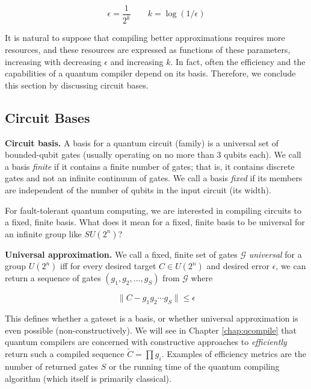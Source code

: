 \begin{equation}
\epsilon = \frac{1}{2^k} \qquad
k = \log(1/\epsilon)
\end{equation}

It is natural to suppose that compiling better approximations requires
more resources, and these resources are expressed as functions of
these
parameters, increasing with decreasing $\epsilon$ and increasing $k$.
In fact, often the efficiency and the
capabilities of a quantum
compiler depend on its basis. Therefore, we conclude this section by
discussing circuit bases.

\subsection{Circuit Bases}
\label{subsec:qcompile-bases}

\begin{definition}{\textbf{Circuit basis.}}
A basis for a quantum circuit (family) is a universal set of
bounded-qubit gates (usually operating on no more than 3 qubits each).
We call a basis \emph{finite} if it contains a finite
number of gates; that is, it contains discrete gates and not an infinite
continuum of gates. We call a basis \emph{fixed} if its members are independent
of the number of qubits in the input circuit (its width).
\end{definition}

For fault-tolerant quantum computing, we are interested in compiling
circuits to a fixed, finite basis. What does it mean for a fixed, finite
basis to be universal for an infinite group like $SU(2^n)$?

\begin{definition}{\textbf{Universal approximation.}}
We call a fixed, finite set of gates $\mathcal{G}$ \emph{universal} for
a group $U(2^n)$ iff for every desired target $C \in U(2^n)$ and
desired error $\epsilon$, we can return a
sequence of gates $(g_1,g_2,\ldots,g_S)$ from $\mathcal{G}$ where

\begin{equation}
\| C - g_1 g_2 \cdots g_S \| \le \epsilon
\end{equation}

\end{definition}

This defines whether a gateset is a basis, or whether universal approximation
is even possible (non-constructively). We will see in
Chapter \ref{chap:qcompile} that
quantum compilers are concerned with constructive approaches to
\emph{efficiently} return such a compiled sequence $\tilde{C} = \prod g_i$.
Examples of efficiency metrics are the number of returned gates $S$ or
the running time of the quantum compiling algorithm (which itself is
primarily classical).

